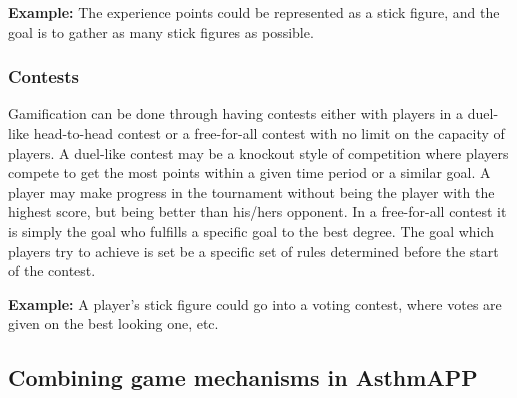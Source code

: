 \textbf{Example:} The experience points could be represented as a stick figure, and the goal is to gather as many stick figures as possible. 

\subsubsection{Contests}
Gamification can be done through having contests either with players in a duel-like head-to-head contest or a free-for-all contest with no limit on the capacity of players. A duel-like contest may be a knockout style of competition where players compete to get the most points within a given time period or a similar goal. A player may make progress in the tournament without being the player with the highest score, but being better than his/hers opponent. In a free-for-all contest it is simply the goal who fulfills a specific goal to the best degree. The goal which players try to achieve is set be a specific set of rules determined before the start of the contest.

\textbf{Example:} A player's stick figure could go into a voting contest, where votes are given on the best looking one, etc. 

\subsection{Combining game mechanisms in AsthmAPP}


